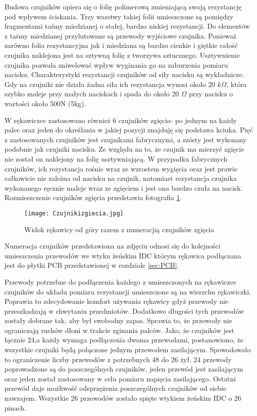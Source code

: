\documentclass[10pt, a4paper]{article}
\begin{document}
\newpage


Budowa czujników opiera się o folię polimerową zmieniającą swoją rezystancję pod wpływem ściskania. Trzy warstwy takiej folii umieszczone są pomiędzy fragmentami taśmy miedzianej o stałej, bardzo niskiej rezystancji. Do elementów z taśmy miedzianej przylutowane są przewody wyjściowe czujnika. Ponieważ zarówno folia rezystancyjna jak i miedziana są bardzo cienkie i giętkie całość czujnika naklejona jest na sztywną folię z tworzywa sztucznego. Usztywnienie czujnika pozwala zniwelować wpływ wyginania go na zaburzenia pomiaru nacisku. Charakterystyki rezystancji czujników od siły nacisku są wykładnicze. Gdy na czujniki nie działa żadna siła ich rezystancja wynosi około 20 $k\Omega$, która szybko maleje przy małych naciskach i spada do około 20 $\Omega$ przy nacisku o wartości około 500N (5kg).

W rękawiczce zastosowano również 6 czujników zgięcia- po jednym na każdy palec oraz jeden do określania w jakiej pozycji znajduję się podstawa kciuka. Pięć z zastosowanych czujników jest czujnikami fabrycznymi, a szósty jest wykonany podobnie jak czujniki nacisku. Ze względu na to, że czujnik ma mierzyć zgięcie nie został on naklejony na folię usztywniającą. W przypadku fabrycznych czujników, ich rezystancja rośnie wraz ze wzrostem wygięcia oraz jest prawie całkowicie nie zależna od nacisku na czujnik, natomiast rezystancja czujnika wykonanego ręcznie maleje wraz ze zgięciem i jest ona bardzo czuła na nacisk. 
Rozmieszczenie czujników zgięcia przedstawia fotografia \ref{gora}.

\begin{figure}[h!]
\texttt{[image: Czujnikizgiecia.jpg]}
\caption{Widok rękawicy od góry razem z numeracjią czujników zgięcia} \label{gora}
\end{figure}

\newpage
Numeracja czujników przedstawiona na zdjęciu odnosi się do kolejności umieszczenia przewodów we wtyku żeńskim IDC którym rękawica podłączana jest do płytki PCB przedstawionej w rozdziale \ref{sec:PCB}. 

Przewody potrzebne do podłączenia każdego z umieszczonych na rękawiczce czujników do układu pomiaru rezystancji umieszczone są na wierzchu rękawiczki. Poprawia to zdecydowanie komfort używania rękawicy gdyż przewody nie przeszkadzają w chwytaniu przedmiotów. Dodatkowo długości tych przewodów zostały dobrane tak, aby był swobodny zapas. Sprawia to, że przewody nie ograniczają ruchów dłoni w trakcie zginania palców. Jako, że czujników jest łącznie 24,a każdy wymaga podłączenia dwoma przewodami, postanowiono, że wszystkie czujniki będą połączone jednym przewodem zasilającym. Spowodowało to ograniczenie liczby przewodów z potrzebnych 48 do 26 żył. 24 przewody poprowadzone są do poszczególnych czujników, jeden przewód jest zasilającym oraz jeden został zastosowany w celu pomiaru napięcia zasilającego. Ostatni przewód daje możliwość odsprzężenia poszczególnych czujników od siebie nawzajem. Wszystkie 26 przewodów zostało spięte wtykiem żeńskim IDC o 26 pinach.
\end{document}
